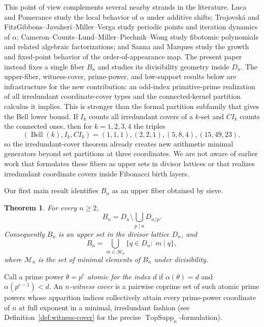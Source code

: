 \documentclass[11pt,letterpaper]{article}
\numberwithin{equation}{section}
\theoremstyle{plain}
\newtheorem{theorem}{Theorem}[section]
\theoremstyle{definition}
\theoremstyle{remark}
\DeclareMathOperator{\TopSupp}{TopSupp}
\begin{document}
This point of view complements several nearby strands in the literature.
Luca and Pomerance \cite{LucaPomerance2014LocalBehavior} study the local
behavior of $\alpha$ under additive shifts; Trojovsk\'a
\cite{Trojovska2020PeriodicPoints} and FitzGibbons--Javaheri--Miller--Verga
\cite{FitzGibbonsJavaheriMillerVerga2025Dynamics} study periodic points and
iteration dynamics of $\alpha$; Cameron--Counts--Lund--Miller--Piechnik--Wong
\cite{CameronCountsLundMillerPiechnikWong2022Fibotomic} study fibotomic
polynomials and related algebraic factorizations; and Sanna
\cite{Sanna2016LucasSequences} and Marques \cite{Marques2012OrderAppearance}
study the growth and fixed-point behavior of the order-of-appearance map. The
present paper instead fixes a single fiber $B_n$ and studies its divisibility
geometry inside $D_n$. The upper-fiber, witness-cover, prime-power, and
low-support results below are infrastructure for the new contribution: an
odd-index primitive-prime realization of all irredundant coordinate-cover types
and the connected-kernel partition calculus it implies. This is stronger than
the formal partition subfamily that gives the Bell lower bound. If $I_k$ counts
all irredundant covers of a $k$-set and $CI_k$ counts the connected ones, then
for $k=1,2,3,4$ the triples
\[
(\operatorname{Bell}(k),I_k,CI_k)=(1,1,1),(2,2,1),(5,8,4),(15,49,23),
\]
so the irredundant-cover theorem already creates new arithmetic minimal
generators beyond set partitions at three coordinates. We are not aware of
earlier work that formulates these fibers as upper sets in divisor lattices or
that realizes irredundant coordinate covers inside Fibonacci birth layers.

Our first main result identifies $B_n$ as an upper fiber obtained by sieve.

\begin{theorem}\label{thm:intro-upper-fiber}
For every \(n\ge2\),
\[
B_n=D_n\setminus\bigcup_{p\mid n}D_{n/p}.
\]
Consequently \(B_n\) is an upper set in the divisor lattice \(D_n\), and
\[
B_n=\bigcup_{m\in\mathcal M_n}\{q\in D_n:\ m\mid q\},
\]
where \(\mathcal M_n\) is the set of minimal elements of \(B_n\) under
divisibility.
\end{theorem}

Call a prime power $\theta=p^e$ \emph{atomic for the index $d$} if
$\alpha(\theta)=d$ and $\alpha(p^{e-1})<d$. An \emph{$n$-witness cover} is a
pairwise coprime set of such atomic prime powers whose apparition indices
collectively attain every prime-power coordinate of $n$ at full exponent in a
minimal, irredundant fashion (see Definition~\ref{def:witness-cover} for the
precise \(\TopSupp_n\)-formulation).
\end{document}
